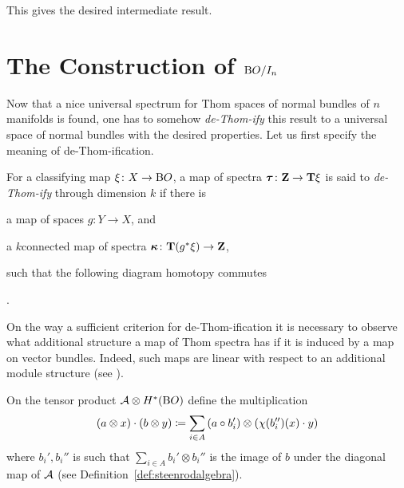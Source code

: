 This gives the desired intermediate result.


\section*{The Construction of $\mathrm{B}O/I_{n}$}
Now that a nice universal spectrum for Thom spaces of normal bundles
of $n$\nbd{}manifolds is found, one has to somehow \emph{de-Thom-ify} this
result to a universal space of normal bundles with the desired
properties.
Let us first specify the meaning of de-Thom-ification.
\begin{Def*}
  For a classifying map $\xi\colon X\to\mathrm{B}O$, a map of spectra
  $\bm{\tau}\colon\bm{\mathrm{Z}}\to\bm{\mathrm{T}}{\xi}$ is said to
  \emph{de-Thom-ify} through dimension $k$ if there is
  \begin{compactitemize}
  \item a map of spaces $g\colon Y\to X$, and
  \item a $k$\nbd{}connected map of spectra
    $\bm{\kappa}\colon\bm{\mathrm{T}}{({g}^*\xi)}\to\bm{\mathrm{Z}}$,
  \end{compactitemize}
  such that the following diagram homotopy commutes
  \begin{center}
    .
  \end{center}
\end{Def*}


On the way a sufficient criterion for de-Thom-ification it
is necessary to observe what additional structure a
map of Thom spectra has if it is induced by a map on vector bundles.
Indeed, such maps are linear with respect to an additional module structure
(see \cite[p.~107ff]{immersionconj}).
\begin{Def*}
  On the tensor product $\mathcal{A}\otimes H^*(\mathrm{B}O)$ define the multiplication
    \begin{gather*}
      (a\otimes x) \cdot (b\otimes y)
      \coloneqq \sum_{i\in A}
      \left(a\circ b_i'\right) \otimes \left(\chi(b_i'')(x)\cdot y\right)
    \end{gather*}
    where $b_i', b_i''$ is such that $\sum_{i\in A}b_i'\otimes b_i''$ is
    the image of $b$ under the diagonal map of $\mathcal{A}$
    (see Definition~\ref{def:steenrodalgebra}).
\end{Def*}

